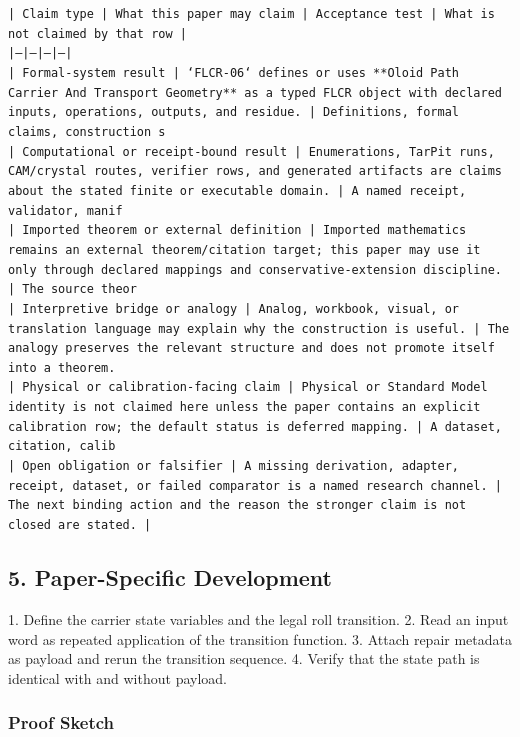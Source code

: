 \documentclass[11pt]{article}
\begin{document}
\noindent\texttt{| Claim type | What this paper may claim | Acceptance test | What is not claimed by that row |}\\
\noindent\texttt{|---|---|---|---|}\\
\noindent\texttt{| Formal-system result | `FLCR-06` defines or uses **Oloid Path Carrier And Transport Geometry** as a typed FLCR object with declared inputs, operations, outputs, and residue. | Definitions, formal claims, construction s}\\
\noindent\texttt{| Computational or receipt-bound result | Enumerations, TarPit runs, CAM/crystal routes, verifier rows, and generated artifacts are claims about the stated finite or executable domain. | A named receipt, validator, manif}\\
\noindent\texttt{| Imported theorem or external definition | Imported mathematics remains an external theorem/citation target; this paper may use it only through declared mappings and conservative-extension discipline. | The source theor}\\
\noindent\texttt{| Interpretive bridge or analogy | Analog, workbook, visual, or translation language may explain why the construction is useful. | The analogy preserves the relevant structure and does not promote itself into a theorem. }\\
\noindent\texttt{| Physical or calibration-facing claim | Physical or Standard Model identity is not claimed here unless the paper contains an explicit calibration row; the default status is deferred mapping. | A dataset, citation, calib}\\
\noindent\texttt{| Open obligation or falsifier | A missing derivation, adapter, receipt, dataset, or failed comparator is a named research channel. | The next binding action and the reason the stronger claim is not closed are stated. | }\\

\subsection*{5. Paper-Specific Development}

1. Define the carrier state variables and the legal roll transition.
2. Read an input word as repeated application of the transition function.
3. Attach repair metadata as payload and rerun the transition sequence.
4. Verify that the state path is identical with and without payload.

\subsubsection*{Proof Sketch}
\end{document}

